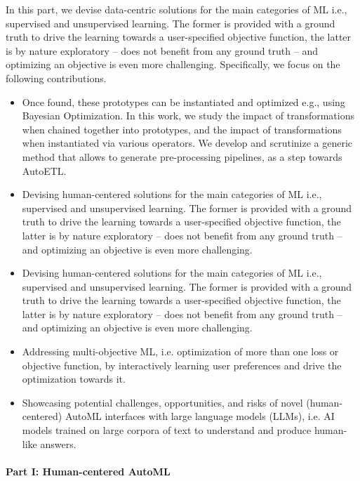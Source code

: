 In this part, we devise data-centric solutions for the main categories of ML i.e., supervised and unsupervised learning.
The former is provided with a ground truth to drive the learning towards a user-specified objective function, the latter is by nature exploratory -- does not benefit from any ground truth -- and optimizing an objective is even more challenging.
Specifically, we focus on the following contributions.
\begin{itemize}
    \item Once found, these prototypes can be instantiated and optimized e.g., using Bayesian Optimization. In this work, we study the impact of transformations when chained together into prototypes, and the impact of transformations when instantiated via various operators. We develop and scrutinize a generic method that allows to generate pre-processing pipelines, as a step towards AutoETL. 
    \item Devising human-centered solutions for the main categories of ML i.e., supervised and unsupervised learning. The former is provided with a ground truth to drive the learning towards a user-specified objective function, the latter is by nature exploratory -- does not benefit from any ground truth -- and optimizing an objective is even more challenging.
    \item Devising human-centered solutions for the main categories of ML i.e., supervised and unsupervised learning. The former is provided with a ground truth to drive the learning towards a user-specified objective function, the latter is by nature exploratory -- does not benefit from any ground truth -- and optimizing an objective is even more challenging.
    \item Addressing multi-objective ML, i.e. optimization of more than one loss or objective function, by interactively learning user preferences and drive the optimization towards it.
    \item Showcasing potential challenges, opportunities, and risks of novel (human-centered) AutoML interfaces with large language models (LLMs), i.e. AI models trained on large corpora of text to understand and produce human-like answers.
\end{itemize}



\paragraph{Part I: Human-centered AutoML}

